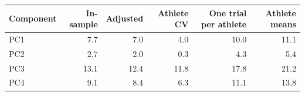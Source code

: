\begin{tabular}{lrrrrr}
\toprule
Component & In-sample & Adjusted & Athlete CV & One trial per athlete & Athlete means \\
\midrule
PC1 & 7.7 & 7.0 & 4.0 & 10.0 & 11.1 \\
PC2 & 2.7 & 2.0 & 0.3 & 4.3 & 5.4 \\
PC3 & 13.1 & 12.4 & 11.8 & 17.8 & 21.2 \\
PC4 & 9.1 & 8.4 & 6.3 & 11.1 & 13.8 \\
\bottomrule
\end{tabular}
